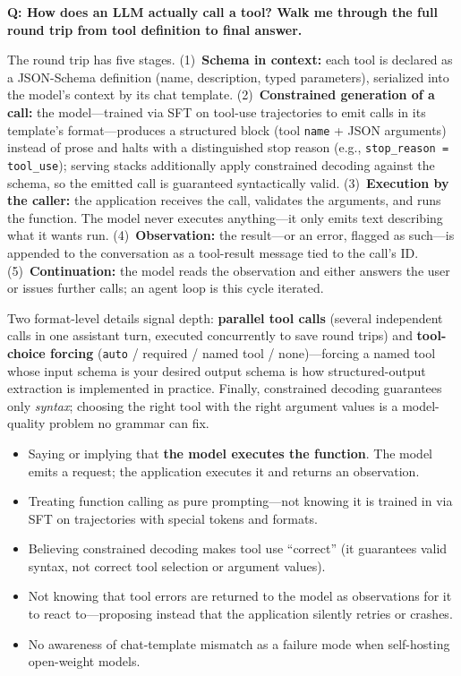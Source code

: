\begin{interviewq}
\textbf{Q: How does an LLM actually call a tool?  Walk me through the full
round trip from tool definition to final answer.}

 \quad {} \quad {} \quad
\badgefreq{\freqhigh}

\stronganswer
The round trip has five stages.  (1)~\textbf{Schema in context:} each tool
is declared as a JSON-Schema definition (name, description, typed
parameters), serialized into the model's context by its chat template.
(2)~\textbf{Constrained generation of a call:} the model---trained via SFT
on tool-use trajectories to emit calls in its template's format---produces
a structured block (tool \texttt{name} + JSON arguments) instead of prose
and halts with a distinguished stop reason (e.g.,
\texttt{stop\_reason = tool\_use}); serving stacks additionally apply
constrained decoding against the schema, so the emitted call is guaranteed
syntactically valid.  (3)~\textbf{Execution by the caller:} the application
receives the call, validates the arguments, and runs the function.  The
model never executes anything---it only emits text describing what it
wants run.  (4)~\textbf{Observation:} the result---or an error, flagged as
such---is appended to the conversation as a tool-result message tied to
the call's ID.  (5)~\textbf{Continuation:} the model reads the observation
and either answers the user or issues further calls; an agent loop is this
cycle iterated.

Two format-level details signal depth: \textbf{parallel tool calls}
(several independent calls in one assistant turn, executed concurrently to
save round trips) and \textbf{tool-choice forcing} (\texttt{auto} /
required / named tool / none)---forcing a named tool whose input schema is
your desired output schema is how structured-output extraction is
implemented in practice.  Finally, constrained decoding guarantees only
\emph{syntax}; choosing the right tool with the right argument values is a
model-quality problem no grammar can fix.

\redflags
\begin{itemize}
\item Saying or implying that \textbf{the model executes the function}.
  The model emits a request; the application executes it and returns an
  observation.
\item Treating function calling as pure prompting---not knowing it is
  trained in via SFT on trajectories with special tokens and formats.
\item Believing constrained decoding makes tool use ``correct'' (it
  guarantees valid syntax, not correct tool selection or argument values).
\item Not knowing that tool errors are returned to the model as
  observations for it to react to---proposing instead that the application
  silently retries or crashes.
\item No awareness of chat-template mismatch as a failure mode when
  self-hosting open-weight models.
\end{itemize}


\end{interviewq}
